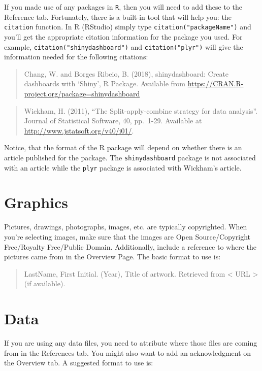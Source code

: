 \documentclass[
]{book}
\begin{document}
If you made use of any packages in \texttt{R}, then you will need to add these to the Reference tab. Fortunately, there is a built-in tool that will help you: the \texttt{citation} function. In R (RStudio) simply type \texttt{citation("packageName")} and you'll get the appropriate citation information for the package you used. For example, \texttt{citation("shinydashboard")} and \texttt{citation("plyr")} will give the information needed for the following citations:

\begin{quote}
Chang, W. and Borges Ribeio, B. (2018), shinydashboard: Create dashboards with `Shiny', R Package. Available from \url{https://CRAN.R-project.org/package=shinydashboard}
\end{quote}

\begin{quote}
Wickham, H. (2011), ``The Split-apply-combine strategy for data analysis''. Journal of Statistical Software, 40, pp.~1-29. Available at \url{http://www.jstatsoft.org/v40/i01/}.
\end{quote}

Notice, that the format of the R package will depend on whether there is an article published for the package. The \texttt{shinydashboard} package is not associated with an article while the \texttt{plyr} package is associated with Wickham's article.

\hypertarget{graphics-1}{%
\section{Graphics}\label{graphics-1}}

Pictures, drawings, photographs, images, etc. are typically copyrighted. When you're selecting images, make sure that the images are Open Source/Copyright Free/Royalty Free/Public Domain. Additionally, include a reference to where the pictures came from in the Overview Page. The basic format to use is:

\begin{quote}
LastName, First Initial. (Year), Title of artwork. Retrieved from \textless{} URL \textgreater{} (if available).
\end{quote}

\hypertarget{data}{%
\section{Data}\label{data}}

If you are using any data files, you need to attribute where those files are coming from in the References tab. You might also want to add an acknowledgment on the Overview tab. A suggested format to use is:
\end{document}
